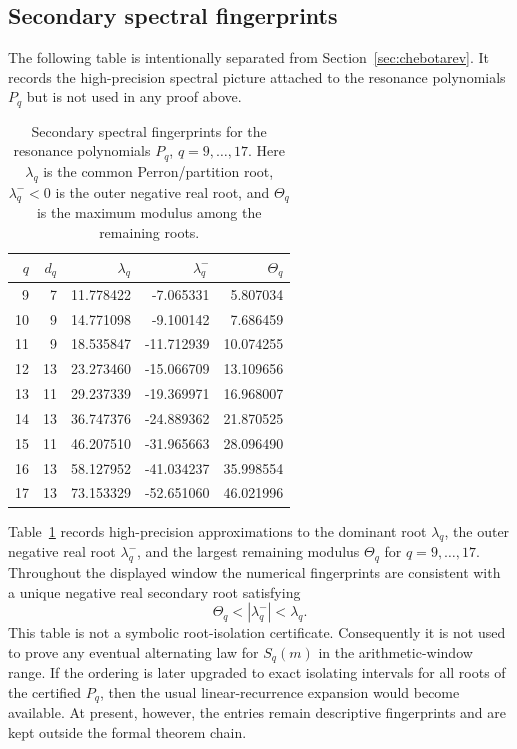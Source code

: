 ﻿\subsection{Secondary spectral fingerprints}

The following table is intentionally separated from
Section~\ref{sec:chebotarev}.  It records the high-precision spectral picture
attached to the resonance polynomials \(P_q\) but is not used in any proof
above.

\begin{table}[t]
\centering
\scriptsize
\setlength{\tabcolsep}{5pt}
\caption{Secondary spectral fingerprints for the resonance polynomials
\(P_q\), \(q=9,\dots,17\).  Here \(\lambda_q\) is the common
Perron/partition root, \(\lambda_q^-<0\) is the outer negative real root, and
\(\Theta_q\) is the maximum modulus among the remaining roots.}
\label{tab:secondary-spectral-q9-17}
\begin{tabular}{r r r r r}
\toprule
\(q\) & \(d_q\) & \(\lambda_q\) & \(\lambda_q^-\) & \(\Theta_q\) \\
\midrule
9  & 7  & 11.778422 & -7.065331  & 5.807034 \\
10 & 9  & 14.771098 & -9.100142  & 7.686459 \\
11 & 9  & 18.535847 & -11.712939 & 10.074255 \\
12 & 13 & 23.273460 & -15.066709 & 13.109656 \\
13 & 11 & 29.237339 & -19.369971 & 16.968007 \\
14 & 13 & 36.747376 & -24.889362 & 21.870525 \\
15 & 11 & 46.207510 & -31.965663 & 28.096490 \\
16 & 13 & 58.127952 & -41.034237 & 35.998554 \\
17 & 13 & 73.153329 & -52.651060 & 46.021996 \\
\bottomrule
\end{tabular}
\end{table}

\begin{remark}
\label{rem:secondary-spectral-pattern}
Table~\ref{tab:secondary-spectral-q9-17} records high-precision approximations
to the dominant root \(\lambda_q\), the outer negative real root
\(\lambda_q^-\), and the largest remaining modulus \(\Theta_q\) for
\(q=9,\dots,17\).  Throughout the displayed window the numerical fingerprints
are consistent with a unique negative real secondary root satisfying
\[
  \Theta_q<|\lambda_q^-|<\lambda_q.
\]
This table is not a symbolic root-isolation certificate.  Consequently it is
not used to prove any eventual alternating law for \(S_q(m)\) in the
arithmetic-window range.  If the ordering is later upgraded to exact isolating
intervals for all roots of the certified \(P_q\), then the usual
linear-recurrence expansion would become available.  At present, however, the
entries remain descriptive fingerprints and are kept outside the formal theorem
chain.
\end{remark}

